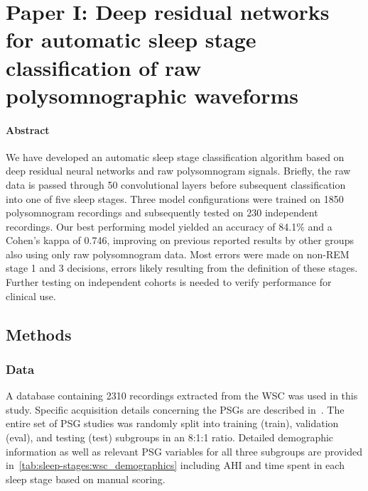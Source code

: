 \section{Paper I: Deep residual networks for automatic sleep stage classification of raw polysomnographic waveforms}\label{sec:paperi}

\begin{tcolorbox}[colframe=white]
\paragraph{Abstract} We have developed an automatic sleep stage classification algorithm based on deep residual neural networks and raw polysomnogram signals. 
Briefly, the raw data is passed through 50 convolutional layers before subsequent classification into one of five sleep stages. 
Three model configurations were trained on 1850 polysomnogram recordings and subsequently tested on 230 independent recordings. 
Our best performing model yielded an accuracy of 84.1\% and a Cohen's kappa of 0.746, improving on previous reported results by other groups also using only raw polysomnogram data. 
Most errors were made on non-REM stage 1 and 3 decisions, errors likely resulting from the definition of these stages. 
Further testing on independent cohorts is needed to verify performance for clinical use.
\end{tcolorbox}

\subsection{Methods}
\subsubsection{Data}
A database containing 2310 recordings extracted from the \ac{WSC} was used in this study.
Specific acquisition details concerning the \acp{PSG} are described in~\cite{Young1993,Young2008}.
The entire set of \ac{PSG} studies was randomly split into training (train), validation (eval), and testing (test) subgroups in an 8:1:1 ratio.
Detailed demographic information as well as relevant \ac{PSG} variables for all three subgroups are provided in~\cref{tab:sleep-stages:wsc_demographics} including \ac{AHI} and time spent in each sleep stage based on manual scoring. %


